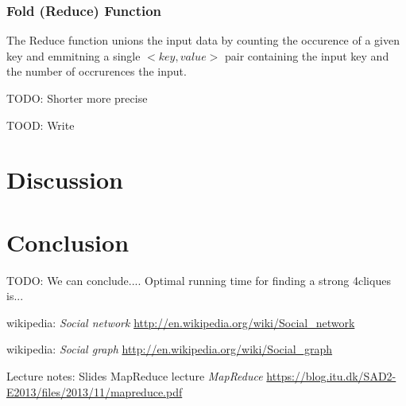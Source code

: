 \documentclass{article}
\begin{document}
\subsubsection{Fold (Reduce) Function}
The Reduce function unions the input data by counting the occurence of a given key and emmitning a single $<key,value>$ pair containing the input key and the number of occrurences the input.




TODO: Shorter more precise


TOOD: Write


\section{Discussion}

\section{Conclusion}
TODO: We can conclude....
Optimal running time for finding a strong 4cliques is...

\begin{thebibliography}{1}

    wikipedia:
    \emph{Social network}
    \url{http://en.wikipedia.org/wiki/Social_network}

    wikipedia:
    \emph{Social graph}
    \url{http://en.wikipedia.org/wiki/Social_graph}

    Lecture notes: Slides MapReduce lecture
    \emph{MapReduce}
    \url{https://blog.itu.dk/SAD2-E2013/files/2013/11/mapreduce.pdf}
    
\end{thebibliography}
\end{document}
